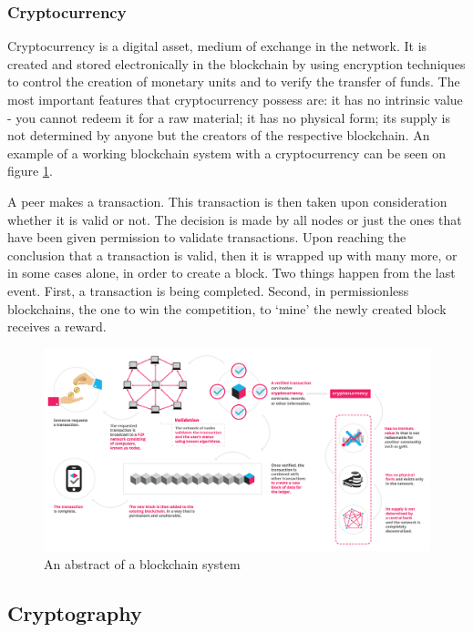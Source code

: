 \documentclass[a4paper,11pt]{report}
\begin{document}
\subsubsection{Cryptocurrency}
Cryptocurrency is a digital asset, medium of exchange in the network. It is created and stored electronically in the blockchain by using encryption techniques to control the creation of monetary units and to verify the transfer of funds. The most important features that cryptocurrency possess are: it has no intrinsic value - you cannot redeem it for a raw material; it has no physical form; its supply is not determined by anyone but the creators of the respective blockchain. \cite{whatIsCryptocurrency}
An example of a working blockchain system with a cryptocurrency can be seen on figure \ref{blockchainAbstract}. 


A peer makes a transaction. This transaction is then taken upon consideration whether it is valid or not. The decision is made by all nodes or just the ones that have been given permission to validate transactions. Upon reaching the conclusion that a transaction is valid,  then it is wrapped up with many more, or in some cases alone, in order to create a block. Two things happen from the last event. First, a transaction is being completed. Second, in permissionless blockchains, the one to win the competition, to ‘mine’ the newly created block receives a reward. 

\begin{figure}[h]
\centering
  \includegraphics[width=16cm]{infographics0517-01-1.png}
  \caption{An abstract of a blockchain system \cite{whatIsBlockgeeks}}
  \label{blockchainAbstract}
\end{figure}

\subsection{Cryptography}
\end{document}
